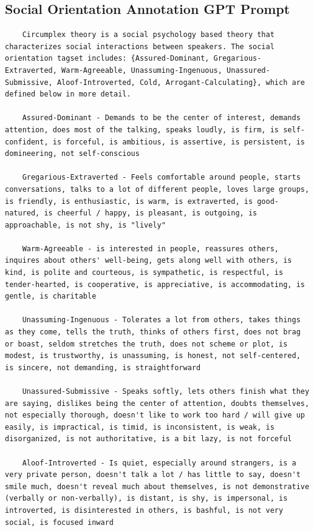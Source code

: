 \documentclass[12pt]{article}
\begin{document}
\subsection{Social Orientation Annotation GPT Prompt}
\begin{lstlisting}
    Circumplex theory is a social psychology based theory that characterizes social interactions between speakers. The social orientation tagset includes: {Assured-Dominant, Gregarious-Extraverted, Warm-Agreeable, Unassuming-Ingenuous, Unassured-Submissive, Aloof-Introverted, Cold, Arrogant-Calculating}, which are defined below in more detail.

    Assured-Dominant - Demands to be the center of interest, demands attention, does most of the talking, speaks loudly, is firm, is self-confident, is forceful, is ambitious, is assertive, is persistent, is domineering, not self-conscious
    
    Gregarious-Extraverted - Feels comfortable around people, starts conversations, talks to a lot of different people, loves large groups, is friendly, is enthusiastic, is warm, is extraverted, is good-natured, is cheerful / happy, is pleasant, is outgoing, is approachable, is not shy, is "lively"
    
    Warm-Agreeable - is interested in people, reassures others, inquires about others' well-being, gets along well with others, is kind, is polite and courteous, is sympathetic, is respectful, is tender-hearted, is cooperative, is appreciative, is accommodating, is gentle, is charitable
    
    Unassuming-Ingenuous - Tolerates a lot from others, takes things as they come, tells the truth, thinks of others first, does not brag or boast, seldom stretches the truth, does not scheme or plot, is modest, is trustworthy, is unassuming, is honest, not self-centered, is sincere, not demanding, is straightforward
    
    Unassured-Submissive - Speaks softly, lets others finish what they are saying, dislikes being the center of attention, doubts themselves, not especially thorough, doesn't like to work too hard / will give up easily, is impractical, is timid, is inconsistent, is weak, is disorganized, is not authoritative, is a bit lazy, is not forceful
    
    Aloof-Introverted - Is quiet, especially around strangers, is a very private person, doesn't talk a lot / has little to say, doesn't smile much, doesn't reveal much about themselves, is not demonstrative (verbally or non-verbally), is distant, is shy, is impersonal, is introverted, is disinterested in others, is bashful, is not very social, is focused inward
    

\end{lstlisting}
\end{document}
